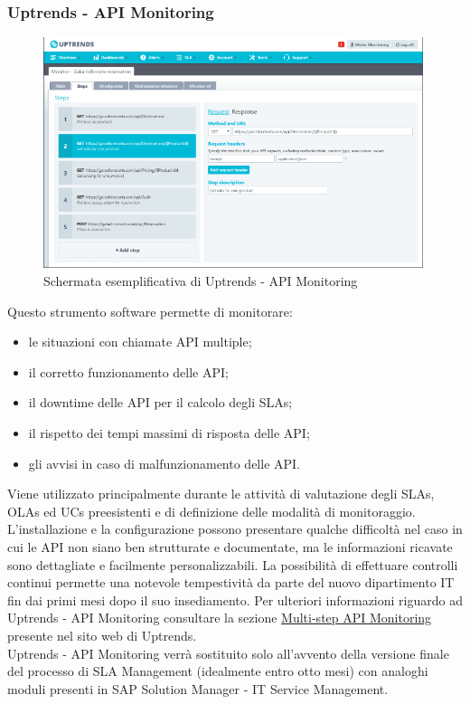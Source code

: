 \subsubsection{Uptrends - API Monitoring}

\begin{figure}[H]
\centering
\includegraphics[width=30em]{immagini/sla/apimonitor.png}
\caption{Schermata esemplificativa di Uptrends - API Monitoring}
\end{figure}

Questo strumento software permette di monitorare:

\begin{itemize}
	\item le situazioni con chiamate API multiple;
    \item il corretto funzionamento delle API;
    \item il downtime delle API per il calcolo degli SLAs;
    \item il rispetto dei tempi massimi di risposta delle API;
    \item gli avvisi in caso di malfunzionamento delle API.
\end{itemize}

Viene utilizzato principalmente durante le attività di valutazione degli SLAs, OLAs ed UCs preesistenti e di definizione delle modalità di monitoraggio. L'installazione e la configurazione possono presentare qualche difficoltà nel caso in cui le API non siano ben strutturate e documentate, ma le informazioni ricavate sono dettagliate e facilmente personalizzabili. La possibilità di effettuare controlli continui permette una notevole tempestività da parte del nuovo dipartimento IT fin dai primi mesi dopo il suo insediamento. Per ulteriori informazioni riguardo ad Uptrends - API Monitoring consultare la sezione \href{https://www.uptrends.com/solutions/api-monitoring}{Multi-step API Monitoring} presente nel sito web di Uptrends.
\\
Uptrends - API Monitoring verrà sostituito solo all'avvento della versione finale del processo di SLA Management (idealmente entro otto mesi) con analoghi moduli presenti in SAP Solution Manager - IT Service Management.


